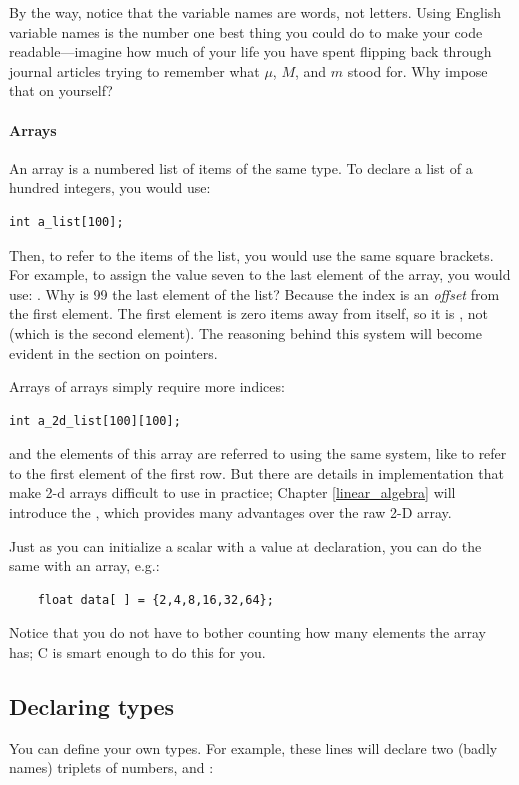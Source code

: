 \documentclass[12pt]{article}
\makeatletter
\def\ind#1{\index{#1}#1}
\def\cindex#1{\index{#1@\ci{#1}}}
\makeatother
\begin{document}
By the way, notice that the variable names are words, not letters. Using
English variable names is the number one best thing you could do to make your code
readable---imagine how much of your life you have spent flipping back
through journal articles trying to remember what $\mu$, $M$, and $m$
stood for. Why impose that on yourself?

\paragraph{Arrays} An \ind{array} is a numbered list of items of the same type. To declare a list of a hundred
integers, you would use:
\begin{lstlisting}
int a_list[100];
\end{lstlisting}
Then, to refer to the items of the list, you would use the same square
brackets. For example, to assign the value seven to the last element
of the array, you would use: . Why is 99 the last
element of the list? Because the index is an {\sl offset} from the first
element. The first element is zero items away from itself, so it is
, not  (which is the second element).
The reasoning behind this system will become evident in the section
on pointers.

Arrays of arrays simply require more indices:\\
\begin{lstlisting}
int a_2d_list[100][100];
\end{lstlisting}
and the elements of this array are referred to using the same system,
like 
 to refer to the first element of the first row.
But there are details in implementation that make 2-d arrays difficult
to use in practice; Chapter \ref{linear_algebra} will introduce
the , which provides many advantages over the raw
2-D array.

Just as you can initialize a scalar with a value at declaration, you can
do the same with an array, e.g.:
\begin{lstlisting}
    float data[ ] = {2,4,8,16,32,64};
\end{lstlisting}
Notice that you do not have to bother counting how many elements the
array has; C is smart enough to do this for you.

\subsection{Declaring types}\cindex{typedef}  
You can define your own
types. For example, these lines will declare two (badly names) triplets
of numbers,  and :
\end{document}
